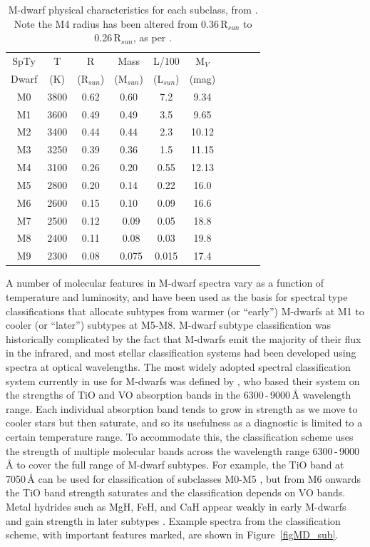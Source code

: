 \begin{table}[!h]
\centering
\begin{tabular}{| c | c | c | c | c | c | c | c | c | c |}
\hline
SpTy & T & R & Mass & L/100 & M$_{V}$ \\
Dwarf & (K) & (R$_{sun}$) & (M$_{sun}$) & (L$_{sun}$) & (mag) \\
\hline
M0 & 3800 & 0.62 & 0.60 & 7.2 & 9.34 \\
M1 & 3600 & 0.49 & 0.49 & 3.5 & 9.65 \\
M2 & 3400 & 0.44 & 0.44 & 2.3 & 10.12 \\	
M3 & 3250 & 0.39 & 0.36 & 1.5 & 11.15 \\
M4 & 3100 & 0.26 & 0.20 & 0.55 & 12.13 \\	
M5 & 2800 & 0.20 & 0.14 & 0.22 & 16.0 \\
M6 & 2600 & 0.15 & 0.10 & 0.09 & 16.6 \\
M7 & 2500 & 0.12 & ~0.09 & 0.05 & 18.8 \\	
M8 & 2400 & 0.11 & ~0.08 & 0.03 & 19.8 \\
M9 & 2300 & 0.08 & ~0.075 & 0.015 & 17.4 \\
\hline
\end{tabular}
\caption{M-dwarf physical characteristics for each subclass, from \citet{2005Reid}. Note the M4 radius has been altered from 0.36\,R$_{sun}$ to 0.26\,R$_{sun}$, as per \citet{2009Kaltenegger}.}
\label{tabMsub}	
\end{table}

A number of molecular features in M-dwarf spectra vary as a function of temperature and 
luminosity, and have been used as the basis for spectral type classifications that allocate subtypes from warmer (or ``early'') M-dwarfs at M1 to cooler (or ``later'') subtypes at M5-M8. M-dwarf subtype classification was historically complicated by the fact that M-dwarfs emit the majority of their flux in the infrared, and most stellar classification systems had been developed using spectra at optical wavelengths. The most widely adopted spectral classification system currently in use for M-dwarfs was defined by \citet{1991Kirkpatrick}, who based their system on the strengths of TiO and VO absorption bands in the 6300\,-\,9000\,\hbox{\AA} wavelength range. Each individual absorption band tends to grow in strength as we move to cooler stars but then saturate, and so its usefulness as a diagnostic is limited to a certain temperature range. To accommodate this, the \citet{1991Kirkpatrick} classification scheme uses the strength of multiple molecular bands across the wavelength range 6300\,-\,9000 \hbox{\AA} to cover the full range of M-dwarf subtypes. For example, the TiO band at 7050\,\hbox{\AA} can be used for classification of subclasses M0-M5 \citep{2005Reid}, but from M6 onwards the TiO band strength saturates and the classification depends on VO bands. Metal hydrides such as MgH, FeH, and CaH appear weakly in early M-dwarfs and gain strength in later subtypes \citep{2005Reid}. Example spectra from the \citet{1991Kirkpatrick} classification scheme, with important features marked, are shown in Figure~\ref{figMD_sub}.\\

